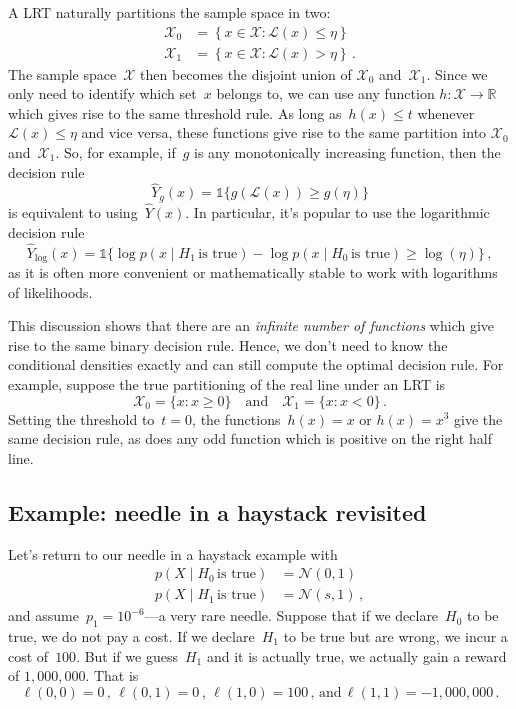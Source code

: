 \documentclass{tufte-book}
\begin{document}
A LRT naturally partitions the sample space in two: \[
\begin{aligned}
\mathcal{X}_0 & = \left\{ x \in \mathcal{X} \colon \mathcal{L}(x) \leq \eta  \right\}\\
\mathcal{X}_1 &=  \left\{ x \in \mathcal{X} \colon \mathcal{L}(x) > \eta  \right\}\,.
\end{aligned}
\] The sample space~\(\mathcal{X}\) then becomes the disjoint union of
\(\mathcal{X}_0\) and~\(\mathcal{X}_1\). Since we only need to identify
which set~\(x\) belongs to, we can use any function
\(h:\mathcal{X} \rightarrow \mathbb{R}\) which gives rise to the same
threshold rule. As long as~\(h(x) \leq t\)
whenever~\(\mathcal{L}(x) \leq \eta\) and vice versa, these functions
give rise to the same partition into \(\mathcal{X}_0\)
and~\(\mathcal{X}_1\). So, for example, if~\(g\) is any monotonically
increasing function, then the decision rule \[
        \hat{Y}_g(x) = \mathbb{1} \{ g(\mathcal{L}(x))\geq g(\eta) \}
\] is equivalent to using~\(\hat{Y}(x)\). In particular, it's popular to
use the logarithmic decision rule \[
    \hat{Y}_{\mathrm{log}}(x)  =  \mathbb{1} \{\log p(x\mid H_1\,\text{is true})- \log p(x\mid H_0\,\text{is true})   \geq \log(\eta)\}\,,
\] as it is often more convenient or mathematically stable to work with
logarithms of likelihoods.

This discussion shows that there are an \emph{infinite number of
functions} which give rise to the same binary decision rule. Hence, we
don't need to know the conditional densities exactly and can still
compute the optimal decision rule. For example, suppose the true
partitioning of the real line under an LRT is \[
  \mathcal{X}_0 = \{x\colon x\geq 0\}\quad\text{and}\quad\mathcal{X}_1 = \{x\colon x< 0\}\,.
\] Setting the threshold to~\(t=0\), the functions~\(h(x) = x\) or
\(h(x)=x^3\) give the same decision rule, as does any odd function which
is positive on the right half line.

\hypertarget{example-needle-in-a-haystack-revisited}{%
\subsection{Example: needle in a haystack
revisited}\label{example-needle-in-a-haystack-revisited}}

Let's return to our needle in a haystack example with
\begin{align*}     p(X\mid H_0\,\text{is true}) &= \mathcal{N}(0,1)\\     p(X\mid H_1\,\text{is true}) &= \mathcal{N}(s,1)\,, \end{align*}
and assume~\(p_1 = 10^{-6}\)---a very rare needle. Suppose that if we
declare~\(H_0\) to be true, we do not pay a cost. If we declare~\(H_1\)
to be true but are wrong, we incur a cost of~\(100\). But if we
guess~\(H_1\) and it is actually true, we actually gain a reward of
\(1,000,000\). That is \[
\ell(0,0) = 0\,,\,\ell(0,1)=0\,,\, \ell(1,0) = 100\,\text{, and}\,\ell(1,1)=-1,000,000\,.
\]
\end{document}
